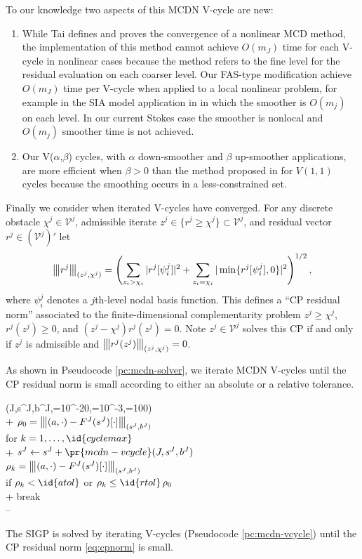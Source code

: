 \documentclass[letterpaper,final,12pt,reqno]{amsart}
\theoremstyle{claim}
\newcommand{\vertiii}[1]{{\left\vert\kern-0.25ex\left\vert\kern-0.25ex\left\vert #1 \right\vert\kern-0.25ex\right\vert\kern-0.25ex\right\vert}}
\numberwithin{equation}{section}
\numberwithin{figure}{section}
\numberwithin{table}{section}
\numberwithin{theorem}{section}
\begin{document}
To our knowledge two aspects of this MCDN V-cycle are new:
\begin{enumerate}
\item While Tai \cite{Tai2003} defines and proves the convergence of a nonlinear MCD method, the implementation of this method cannot achieve $O(m_J)$ time for each V-cycle in nonlinear cases because the method refers to the fine level for the residual evaluation on each coarser level.  Our FAS-type modification achieve $O(m_J)$ time per V-cycle when applied to a local nonlinear problem, for example in the SIA model application in \cite{Bueler2022} in which the smoother is $O(m_j)$ on each level.  In our current Stokes case the smoother is nonlocal and $O(m_j)$ smoother time is not achieved.
\item Our V($\alpha$,$\beta$) cycles, with $\alpha$ down-smoother and $\beta$ up-smoother applications, are more efficient when $\beta >0$ than the method proposed in \cite{GraeserKornhuber2009} for $V(1,1)$ cycles because the smoothing occurs in a less-constrained set.
\end{enumerate}

Finally we consider when iterated V-cycles have converged.  For any discrete obstacle $\chi^j \in \mathcal{V}^j$, admissible iterate $z^j\in \{r^j \ge \chi^j\} \subset \mathcal{V}^j$, and residual vector $r^j \in (\mathcal{V}^j)'$ let
\begin{equation}
\vertiii{r^j}_{(z^j,\chi^j)} = \left(\sum_{z_i > \chi_i} |r^j[\psi_i^j]|^2 + \sum_{z_i = \chi_i} |\min\{r^j[\psi_i^j],0\}|^2\right)^{1/2}, \label{eq:cpnorm}
\end{equation}
where $\psi_i^j$ denotes a $j$th-level nodal basis function.  This defines a ``CP residual norm'' associated to the finite-dimensional complementarity problem $z^j \ge \chi^j$, $r^j(z^j) \ge 0$, and $(z^j-\chi^j) r^j(z^j) = 0$.  Note $z^j \in \mathcal{V}^j$ solves this CP if and only if $z^j$ is admissible and $\vertiii{r^j(z^j)}_{(z^j,\chi^j)}=0$.

As shown in Pseudocode \ref{pc:mcdn-solver}, we iterate MCDN V-cycles until the CP residual norm is small according to either an absolute or a relative tolerance.

\begin{pcode}[ht]
\begin{pseudo*}
(J,s^J,b^J,=10^{-20},=10^{-3},=100)\text{:} \\+
    $\rho_0=\vertiii{(a,\cdot) - F^J(s^J)[\cdot]}_{(s^J,b^J)}$ \\
    for $k=1,\dots,\id{cyclemax}$ \\+
        $s^J \gets s^J + \pr{mcdn-vcycle}(J,s^J,b^J)$ \\
        $\rho_k=\vertiii{(a,\cdot) - F^J(s^J)[\cdot]}_{(s^J,b^J)}$ \\
        if $\rho_k < \id{atol}$ or $\rho_k \le \id{rtol} \, \rho_0$ \\+
            break \\--
\end{pseudo*}
\caption{The SIGP is solved by iterating V-cycles (Pseudocode \ref{pc:mcdn-vcycle}) until the CP residual norm \eqref{eq:cpnorm} is small.}
\label{pc:mcdn-solver}
\end{pcode}
\end{document}
